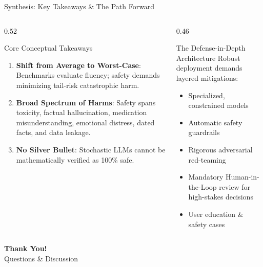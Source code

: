 \documentclass[aspectratio=169, 10pt]{beamer}
\begin{document}
\begin{frame}{Synthesis: Key Takeaways \& The Path Forward}
  \begin{columns}[T]
    \begin{column}{0.52\textwidth}
      \begin{block}{Core Conceptual Takeaways}
        \begin{enumerate}
          \item \textbf{Shift from Average to Worst-Case}: Benchmarks evaluate fluency; safety demands minimizing tail-risk catastrophic harm.
          \item \textbf{Broad Spectrum of Harms}: Safety spans toxicity, factual hallucination, medication misunderstanding, emotional distress, dated facts, and data leakage.
          \item \textbf{No Silver Bullet}: Stochastic LLMs cannot be mathematically verified as 100\% safe.
        \end{enumerate}
      \end{block}
    \end{column}

    \begin{column}{0.46\textwidth}
      \begin{exampleblock}{The Defense-in-Depth Architecture}
        Robust deployment demands layered mitigations:
        \begin{itemize}
          \item Specialized, constrained models
          \item Automatic safety guardrails
          \item Rigorous adversarial red-teaming
          \item Mandatory Human-in-the-Loop review for high-stakes decisions
          \item User education \& safety cases
        \end{itemize}
      \end{exampleblock}
    \end{column}
  \end{columns}

  \vskip 4mm
  \centering
  \textbf{\large Thank You!}\\
  \vspace{1mm}
  \small Questions \& Discussion
\end{frame}
\end{document}
